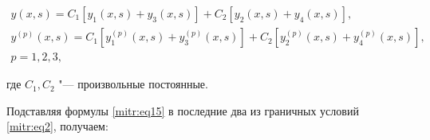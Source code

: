 \begin{equation}

\label{mitr:eq15}

\begin{gathered}

y(x,s)=C_1[y_1(x,s)+y_3(x,s)]+C_2[y_2(x,s)+y_4(x,s)],\\

y^{(p)}(x,s)=C_1[y^{(p)}_1(x,s)+y^{(p)}_3(x,s)]+C_2[y^{(p)}_2(x,s)+y^{(p)}_4(x,s)],\\

p=1,2,3,


\end{gathered}

\end{equation}

где $C_1,C_2$ "--- произвольные постоянные.



Подставляя формулы \eqref{mitr:eq15} в последние два из граничных условий \eqref{mitr:eq2}, получаем:


